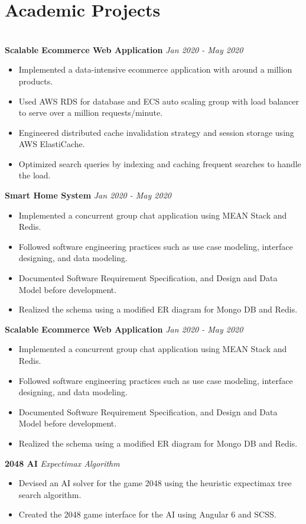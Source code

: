 \documentclass{resume}
\begin{document}
\section*{Academic Projects}
\titlerule
\noindent
\\
\textbf{Scalable Ecommerce Web Application} \hfill \textit{Jan 2020 - May 2020}
\begin{itemize}
  \item Implemented a data-intensive ecommerce application with around a million products.
  \item Used AWS RDS for database and ECS auto scaling group with load balancer to serve over a million requests/minute.
  \item Engineered distributed cache invalidation strategy and session storage using AWS ElastiCache.
  \item Optimized search queries by indexing and caching frequent searches to handle the load.
\end{itemize}
\textbf{Smart Home System} \hfill \textit{Jan 2020 - May 2020}
\begin{itemize}
  \item Implemented a concurrent group chat application using MEAN Stack and Redis.
  \item Followed software engineering practices such as use case modeling, interface designing, and data modeling.
  \item Documented Software Requirement Specification, and Design and Data Model before development.
  \item Realized the schema using a modified ER diagram for Mongo DB and Redis.
\end{itemize}
\textbf{Scalable Ecommerce Web Application} \hfill \textit{Jan 2020 - May 2020}
\begin{itemize}
  \item Implemented a concurrent group chat application using MEAN Stack and Redis.
  \item Followed software engineering practices such as use case modeling, interface designing, and data modeling.
  \item Documented Software Requirement Specification, and Design and Data Model before development.
  \item Realized the schema using a modified ER diagram for Mongo DB and Redis.
\end{itemize}
\textbf{2048 AI} \hfill \textit{Expectimax Algorithm}
\begin{itemize}
  \item Devised an AI solver for the game 2048 using the heuristic expectimax tree search algorithm.
  \item Created the 2048 game interface for the AI using Angular 6 and SCSS.
\end{itemize}
\end{document}
